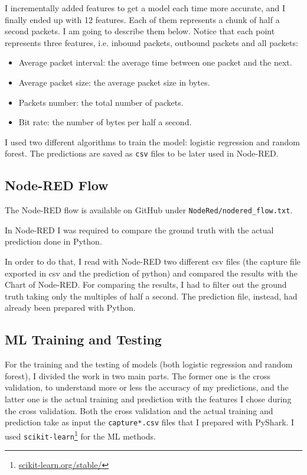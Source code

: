 I incrementally added features to get a model each time more accurate, and I finally ended up with 12 features. Each of them represents a chunk of half a second packets. I am going to describe them below. Notice that each point represents three features, i.e. inbound packets, outbound packets and all packets:
\begin{itemize}
    \item Average packet interval: the average time between one packet and the next.
    \item Average packet size: the average packet size in bytes.
    \item Packets number: the total number of packets.
    \item Bit rate: the number of bytes per half a second.
\end{itemize}

I used two different algorithms to train the model: logistic regression and random forest. The predictions are saved as \texttt{csv} files to be later used in Node-RED.

\subsection{Node-RED Flow}
The Node-RED flow is available on GitHub under \texttt{NodeRed/nodered\_flow.txt}.

In Node-RED I was required to compare the ground truth with the actual prediction done in Python.

In order to do that, I read with Node-RED two different csv files (the capture file exported in csv and the prediction of python) and compared the results with the Chart of Node-RED. For comparing the results, I had to filter out the ground truth taking only the multiples of half a second. The prediction file, instead, had already been prepared with Python.

\subsection{ML Training and Testing}
For the training and the testing of models (both logistic regression and random forest), I divided the work in two main parts. The former one is the cross validation, to understand more or less the accuracy of my predictions, and the latter one is the actual training and prediction with the features I chose during the cross validation. Both the cross validation and the actual training and prediction take as input the \texttt{capture*.csv} files that I prepared with PyShark. I used \texttt{scikit-learn}\footnote{\href{https://scikit-learn.org/stable/}{scikit-learn.org/stable/}} for the ML methods.

